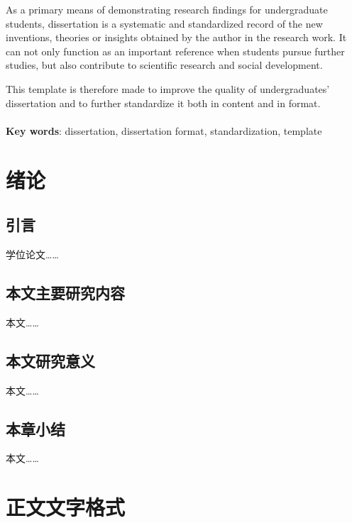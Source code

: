\documentclass[UTF8,a4paper,12pt]{ctexart}
\numberwithin{equation}{section}
\begin{document}
\hspace{8mm}As a primary means of demonstrating research findings for undergraduate students, dissertation is a systematic and standardized record of the new inventions, theories or insights obtained by the author in the research work. It can not only function as an important reference when students pursue further studies, but also contribute to scientific research and social development.\par 
This template is therefore made to improve the quality of undergraduates’ dissertation and to further standardize it both in content and in format.\\
~\\ 
\textbf{Key words}: dissertation, dissertation format, standardization, template

\newpage
\renewcommand\contentsname{\textbf{目\quad 录}}
\begin{center}
{\tableofcontents
\thispagestyle{fancy}
}
\end{center}

\newpage
{}
\section{绪论}
\subsection{引言}
学位论文……
\subsection{本文主要研究内容}
本文……
\subsection{本文研究意义}
本文……
\subsection{本章小结}
本文……

\newpage
{}
\section{正文文字格式}
\end{document}
